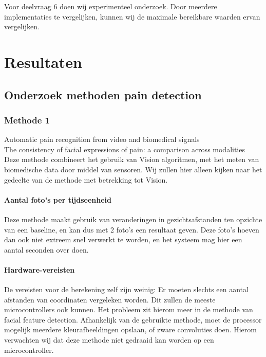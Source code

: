 \documentclass[11pt]{article}
\begin{document}
    Voor deelvraag 6 doen wij experimenteel onderzoek.
    Door meerdere implementaties te vergelijken, kunnen wij de maximale bereikbare waarden ervan vergelijken.


    \section{Resultaten}

    \subsection{Onderzoek methoden pain detection}

    \subsubsection{Methode 1}

    \emph{\citet{werner2014automatic}} Automatic pain recognition from video and biomedical signals\\
    \emph{\citet{prkachin1992consistency}} The consistency of facial expressions of pain: a comparison across modalities\\
    Deze methode combineert het gebruik van Vision algoritmen, met het meten van biomedische data door middel van sensoren.
    Wij zullen hier alleen kijken naar het gedeelte van de methode met betrekking tot Vision.

    \paragraph{Aantal foto's per tijdseenheid}
    Deze methode maakt gebruik van veranderingen in gezichtsafstanden ten opzichte van een baseline, en kan dus met 2 foto's een resultaat geven.
    Deze foto's hoeven dan ook niet extreem snel verwerkt te worden, en het systeem mag hier een aantal seconden over doen.

    \paragraph{Hardware-vereisten}
    De vereisten voor de berekening zelf zijn weinig: Er moeten slechts een aantal afstanden van coordinaten vergeleken worden.
    Dit zullen de meeste microcontrollers ook kunnen.
    Het probleem zit hierom meer in de methode van facial feature detection.
    Afhankelijk van de gebruikte methode, moet de processor mogelijk meerdere kleurafbeeldingen opslaan, of zware convoluties doen.
    Hierom verwachten wij dat deze methode niet gedraaid kan worden op een microcontroller.
\end{document}

